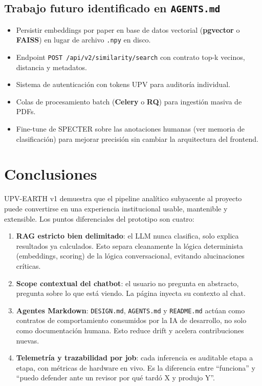\documentclass[11pt,a4paper]{article}
\newcommand{\tech}[1]{\textbf{\textcolor{accent}{#1}}}
\newcommand{\file}[1]{\texttt{\small #1}}
\begin{document}
\subsection{Trabajo futuro identificado en \texttt{AGENTS.md}}

\begin{itemize}
\item Persistir embeddings por paper en base de datos vectorial (\tech{pgvector} o \tech{FAISS}) en lugar de archivo \file{.npy} en disco.
\item Endpoint \texttt{POST /api/v2/similarity/search} con contrato top-k vecinos, distancia y metadatos.
\item Sistema de autenticación con tokens UPV para auditoría individual.
\item Colas de procesamiento batch (\tech{Celery} o \tech{RQ}) para ingestión masiva de PDFs.
\item Fine-tune de SPECTER sobre las anotaciones humanas (ver memoria de clasificación) para mejorar precisión sin cambiar la arquitectura del frontend.
\end{itemize}

\section{Conclusiones}

UPV-EARTH v1 demuestra que el pipeline analítico subyacente al proyecto puede convertirse en una experiencia institucional usable, mantenible y extensible. Los puntos diferenciales del prototipo son cuatro:

\begin{enumerate}
\item \textbf{RAG estricto bien delimitado}: el LLM nunca clasifica, solo explica resultados ya calculados. Esto separa cleanamente la lógica determinista (embeddings, scoring) de la lógica conversacional, evitando alucinaciones críticas.
\item \textbf{Scope contextual del chatbot}: el usuario no pregunta en abstracto, pregunta sobre lo que está viendo. La página inyecta su contexto al chat.
\item \textbf{Agentes Markdown}: \file{DESIGN.md}, \file{AGENTS.md} y \file{README.md} actúan como contratos de comportamiento consumidos por la IA de desarrollo, no solo como documentación humana. Esto reduce drift y acelera contribuciones nuevas.
\item \textbf{Telemetría y trazabilidad por job}: cada inferencia es auditable etapa a etapa, con métricas de hardware en vivo. Es la diferencia entre ``funciona'' y ``puedo defender ante un revisor por qué tardó X y produjo Y''.
\end{enumerate}
\end{document}
